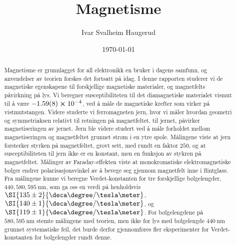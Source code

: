 \documentclass[%
 reprint,
nofootinbib,
aps,
]{revtex4-1}
\begin{document}

\title{Magnetisme}%

\author{Ivar Svalheim Haugerud}

%

\date{\today}%

\begin{abstract}
Magnetisme er grunnlagget for all elektronikk en bruker i dagens samfunn, og anvendelser av teorien forskes det fortsatt på idag. I denne rapporten studerer vi de magnetiske egenskapene til forskjellige magnetiske materialer, og magnetfelts påvirkning på lys. Vi beregner susceptibiliteten til det diamagnetiske materialet vismut til å være $-1.59(8)\cross 10^{-4}$, ved å måle de magnetiske krefter som virker på vistmutstangen.
Videre studerte vi ferromagneten jern, hvor vi måler hvordan geometri og symmetriaksen relativt til retningen på magnetfeltet, til jernet, påvirker magnetiseringen av jernet. Jern ble videre studert ved å måle forholdet mellom magnetiseringen og magnetfeltet grunnet strøm i en ytre spole. Målingene viste at jern forsterker styrken på magnetfeltet, grovt sett, med rundt en faktor $250$, og at susceptibiliteten til jern ikke er en konstant, men en funksjon av stykren på magnetfeltet. Målinger av Faraday-effekten viste at monokromatiske elektromagnetiske bølger endrer polarisasjonsvinkel av å bevege seg gjennom magnetfelt inne i flintglass. Fra målingene kunne vi beregne Verdet-konstanten for tre forskjellige bølgelengder, $440, 580, \SI{595}{\nano\meter}$, som ga oss en verdi på henholdsvis $\SI{135\pm2}{\deca\degree/\tesla\meter}$, $\SI{140\pm1}{\deca\degree/\tesla\meter}$, og $\SI{119\pm1}{\deca\degree/\tesla\meter}$.
For bølgelengdene på $580, \SI{595}{\nano\meter}$ stemte målingene med teorien, men ikke for lys med bølgelengde $\SI{440}{\nano\meter}$ grunnet systematiske feil, det burde derfor gjennomføres fler eksperimenter for Verdet-konstanten for bølgelengder rundt denne.
\end{abstract}

\maketitle
\end{document}
